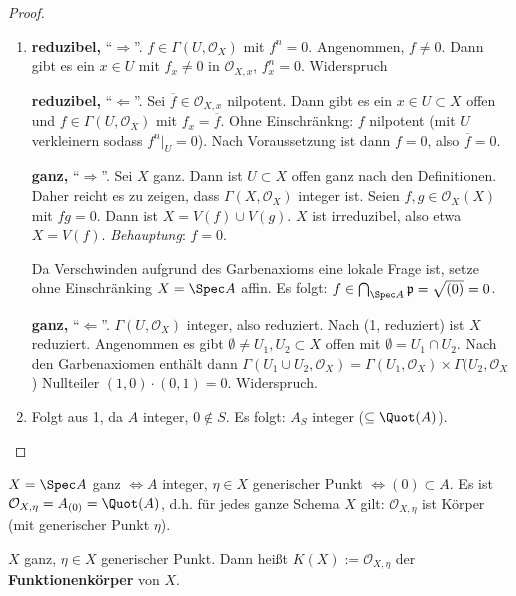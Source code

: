\begin{proof}
  \mbox{}
  \begin{enumerate}
  \item \textbf{reduzibel,} ``$\Rightarrow$''. $f\in\Gamma(U,\mathcal{O}_{X})$
    mit $f^{n}=0$. Angenommen, $f\neq0$. Dann gibt es ein $x\in U$
    mit $f_{x}\neq0$ in $\mathcal{O}_{X,x}$, $f_{x}^{n}=0$. Widerspruch

    \textbf{reduzibel,} ``$\Leftarrow$''. Sei $\overline{f}\in\mathcal{O}_{X,x}$
    nilpotent. Dann gibt es ein $x\in U\subset X$ offen und $f\in\Gamma(U,\mathcal{O}_{X})$
    mit $f_{x}=\overline{f}$. Ohne Einschränkng: $f$ nilpotent (mit
    $U$ verkleinern sodass $f^{n}|_{U}=0$). Nach Voraussetzung ist dann
    $f=0$, also $\overline{f}=0$.

    \textbf{ganz,} ``$\Rightarrow$''. Sei $X$ ganz. Dann ist $U\subset X$
    offen ganz nach den Definitionen. Daher reicht es zu zeigen, dass
    $\Gamma(X,\mathcal{O}_{X})$ integer ist. Seien $f,g\in\mathcal{O}_{X}(X)$
    mit $fg=0$. Dann ist $X=V(f)\cup V(g)$. $X$ ist irreduzibel, also
    etwa $X=V(f)$. \emph{Behauptung}: $f=0$.

    Da Verschwinden aufgrund des Garbenaxioms eine lokale Frage ist, setze
    ohne Einschränking $X=\Spec A$ affin. Es folgt: $f\in\bigcap_{\Spec A}\mathfrak{p}=\sqrt{(0)}=0$.

    \textbf{ganz, }``$\Leftarrow$''. $\Gamma(U,\mathcal{O}_{X})$ integer,
    also reduziert. Nach (1, reduziert) ist $X$ reduziert. Angenommen
    es gibt $\emptyset\neq U_{1},U_{2}\subset X$ offen mit $\emptyset=U_{1}\cap U_{2}$.
    Nach den Garbenaxiomen enthält dann $\Gamma(U_{1}\cup U_{2},\mathcal{O}_{X})=\Gamma(U_{1},\mathcal{O}_{X})\times\Gamma(U_{2},\mathcal{O}_{X}$)
    Nullteiler $(1,0)\cdot(0,1)=0$. Widerspruch.
  \item Folgt aus 1, da $A$ integer, $0\notin S$. Es folgt: $A_{S}$ integer
    ($\subseteq\Quot(A)$).
  \end{enumerate}
\end{proof}
\begin{rem*}
  $X=\Spec A$ ganz $\Leftrightarrow A$ integer, $\eta\in X$ generischer
  Punkt $\Leftrightarrow(0)\subset A$. Es ist $\mathcal{O}_{X,\eta}=A_{(0)}=\Quot(A)$,
  d.h. für jedes ganze Schema $X$ gilt: $\mathcal{O}_{X,\eta}$ ist
  Körper (mit generischer Punkt $\eta$).
\end{rem*}
\begin{defn}[23]
  $X$ ganz, $\eta\in X$ generischer Punkt. Dann heißt $K(X):=\mathcal{O}_{X,\eta}$
  der \textbf{Funktionenkörper} von $X$.
\end{defn}

